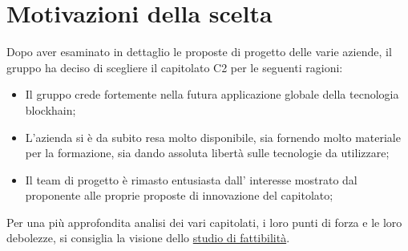 \section{Motivazioni della scelta}\label{section:motivazioni}

Dopo aver esaminato in dettaglio le proposte di progetto delle varie aziende,
 il gruppo ha deciso di scegliere il capitolato C2 per le seguenti ragioni:
\begin{itemize}
    \item Il gruppo crede fortemente nella futura applicazione globale della tecnologia blockhain;
    \item L'azienda si è da subito resa molto disponibile, sia fornendo molto materiale per la formazione, sia dando assoluta libertà sulle tecnologie da utilizzare;
    \item  Il team di progetto è rimasto entusiasta dall' interesse mostrato dal proponente alle proprie proposte di innovazione del capitolato;
\end{itemize}

Per una più approfondita analisi dei vari capitolati,
 i loro punti di forza e le loro debolezze, si consiglia la visione dello \href{https://yakuzaishi-swe.github.io/docs/docs/studio_fattibilita.pdf}{studio di fattibilità}.
